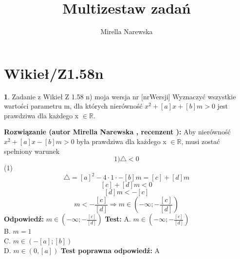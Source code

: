 \documentclass[12pt, a4paper]{article}
\title{Multizestaw zadań}
\author{Mirella Narewska}
\date{}
\theoremstyle{definition} %
\newtheorem{zad}{}
\newcommand{\kategoria}[1]{\section{#1}} %
\newcommand{\zadStart}[1]{\begin{zad}#1\newline} %
\newcommand{\zadStop}{\end{zad}}   %
\newcommand{\rozwStart}[2]{\noindent \textbf{Rozwiązanie (autor #1 , recenzent #2): }\newline} %
\newcommand{\odpStart}{\noindent \textbf{Odpowiedź:}\newline}    %
\newcommand{\odpStop}{\newline}                                             %
\newcommand{\testStart}{\noindent \textbf{Test:}\newline} %
\newcommand{\testStop}{\newline} %
\newcommand{\kluczStart}{\noindent \textbf{Test poprawna odpowiedź:}\newline} %
\newcommand{\kluczStop}{\newline} %
\begin{document}
\maketitle


\kategoria{Wikieł/Z1.58n}
\zadStart{Zadanie z Wikieł Z 1.58 n) moja wersja nr [nrWersji]}
Wyznaczyć wszystkie wartości parametru m, dla których nierówność $x^2+[a]x+[b]m>0$ jest prawdziwa dla każdego x $\in \mathbb{R}.$
\zadStop
\rozwStart{Mirella Narewska}{}
Aby nierówność $x^2+[a]x-[b]m>0$ była prawdziwa dla każdego  x $\in \mathbb{R}$, musi zostać spełniony warunek
$$1)  \triangle<0$$
(1)
\\
$$\triangle=[a]^2-4\cdot1\cdot-[b]m=[c]+[d]m$$
$$[c]+[d]m<0$$
$$[d]m<-[c]$$ 
$$m<-\frac{[c]}{[d]} \Rightarrow m \in (-\infty;-\frac{[c]}{[d]})$$
\odpStart
$m \in (-\infty;-\frac{[c]}{[d]})$
\odpStop
\testStart
A. $m \in (-\infty;-\frac{[c]}{[d]})$ \\
B. $m=1$ \\
C. $m \in (-[a];[b])$ \\
D. $m \in (0,[a])$ 
\testStop
\kluczStart
A
\kluczStop
\end{document}
